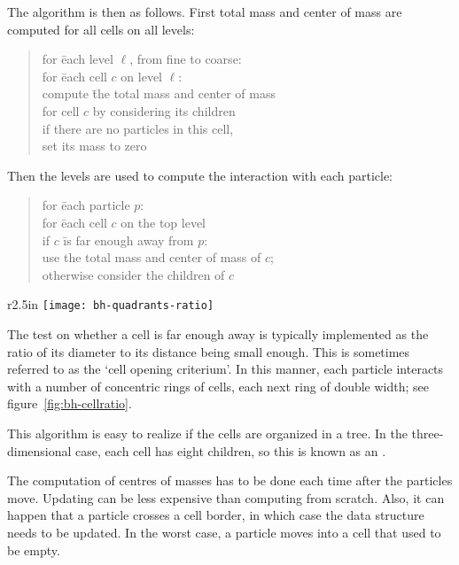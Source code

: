 The algorithm is then as follows. First total mass and center of mass
are computed for all cells on all levels:
\begin{quotation}
  \begin{tabbing}
    for \=each level $\ell$, from fine to coarse:\\
    \>for \=each cell $c$ on level $\ell$:\\
    \>\> compute \=the total mass and center of mass\\
    \>\>\> for cell $c$ by considering its children\\
    \> if there are no particles in this cell,\\
    \>\> set its mass to zero
  \end{tabbing}
\end{quotation}
Then the levels are used to compute the interaction with each particle:
\begin{quotation}
  \begin{tabbing}
    for \=each particle $p$:\\
    \>for \=each cell $c$ on the top level\\
    \>\>if $c$ \=is far enough away from $p$:\\
    \>\>\>use the total mass and center of mass of $c$;\\
    \>\>otherwise consider the children of $c$
  \end{tabbing}
\end{quotation}

\begin{wrapfigure}{r}{2.5in}
\texttt{[image: bh-quadrants-ratio]}
\caption{Boxes with constant distance/diameter ratio.}
\label{fig:bh-cellratio}
\end{wrapfigure}
%
The test on whether a cell is far enough away is typically implemented
as the ratio of its diameter to its distance being small enough. This
is sometimes referred to as the `cell opening criterium'. In this manner, 
each particle interacts with a number of concentric rings of cells,
each next ring of double width; see figure~\ref{fig:bh-cellratio}.

This algorithm is easy to realize if the cells are
organized in a tree. In the three-dimensional case, each cell has
eight children, so this is known as an .

The computation of centres of masses has to be done each time after
the particles move. Updating can be less expensive than computing from
scratch. Also, it can happen that a particle crosses a cell border, in
which case the data structure needs to be updated. In the worst case,
a particle moves into a cell that used to be empty.

